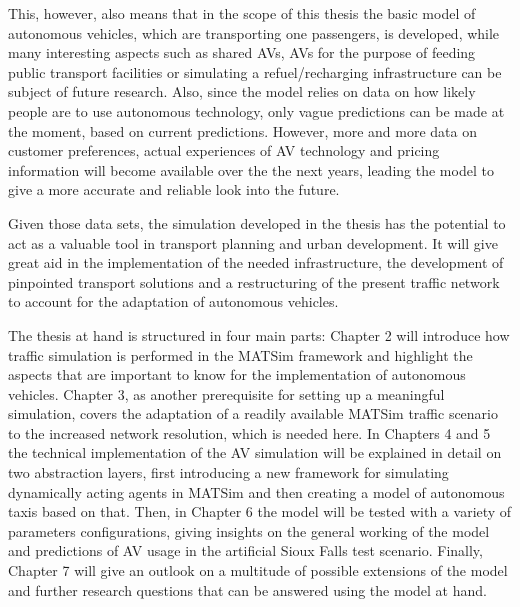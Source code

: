 This, however, also means that in the scope of this thesis the basic model of
autonomous vehicles, which are transporting one passengers, is developed, while
many interesting aspects such as shared AVs, AVs for the purpose of feeding
public transport facilities or simulating a refuel/recharging infrastructure can
be subject of future research. Also, since the model relies on data on how likely
people are to use autonomous technology, only vague predictions can be made at
the moment, based on current predictions. However, more and more data on customer
preferences, actual experiences of AV technology and pricing information will
become available over the the next years, leading the model to give a more accurate
and reliable look into the future.

Given those data sets, the simulation developed in the thesis has the potential
to act as a valuable tool in transport planning and urban development. It will give
great aid in the implementation of the needed infrastructure, the development of
pinpointed transport solutions and a restructuring of the present traffic network
to account for the adaptation of autonomous vehicles.

The thesis at hand is structured in four main parts: Chapter 2 will introduce how
traffic simulation is performed in the MATSim framework and highlight the aspects
that are important to know for the implementation of autonomous vehicles. Chapter 3,
as another prerequisite for setting up a meaningful simulation, covers the adaptation
of a readily available MATSim traffic scenario to the increased network resolution,
which is needed here. In Chapters 4 and 5 the technical implementation
of the AV simulation will be explained in detail on two abstraction layers, first
introducing a new framework for simulating dynamically acting agents in MATSim
and then creating a model of autonomous taxis based on that. Then, in Chapter 6
the model will be tested with a variety of parameters configurations, giving
insights on the general working of the model and predictions of AV usage in the
artificial Sioux Falls test scenario. Finally, Chapter 7 will give an outlook on
a multitude of possible extensions of the model and further research questions that
can be answered using the model at hand.
